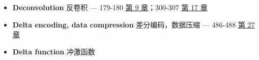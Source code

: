 \begin{itemize}
  \begin{itemize}
  \tightlist
  \item
    defined：定义 --- 98  \hyperref[ch-05]{第 5 章}
  \item
    even/odd decomposition：偶/奇分解 --- 102-103 
    \hyperref[ch-05]{第 5 章}；240-242  \hyperref[ch-12]{第 12
    章}
  \item
    Fourier decomposition：傅里叶分解 --- 104, 105 
    \hyperref[ch-05]{第 5 章}；147  \hyperref[ch-08]{第 8 章}
  \item
    impulse decomposition：冲激分解 --- 100-101 
    \hyperref[ch-05]{第 5 章}
  \item
    interlaced decomposition：交错分解 --- 103-104 
    \hyperref[ch-05]{第 5 章}；228-229  \hyperref[ch-12]{第 12
    章}
  \item
    step decomposition：阶跃分解 --- 100-101 
    \hyperref[ch-05]{第 5 章}
  \item
    strategy for using：使用策略 --- 98-100 
    \hyperref[ch-05]{第 5 章}
  \end{itemize}
\item
  \textbf{Deconvolution} 反卷积 --- 179-180 
  \hyperref[ch-09]{第 9 章}；300-307  \hyperref[ch-17]{第 17
  章}
\item
  \textbf{Delta encoding, data compression} 差分编码，数据压缩 ---
  486-488  \hyperref[ch-27]{第 27 章}
\item
  \textbf{Delta function} 冲激函数


\end{itemize}
